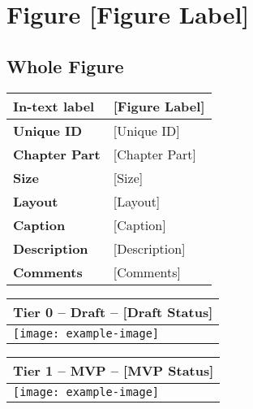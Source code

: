\clearpage

\section{Figure [Figure Label]} \label{sec_[Figure Label]}

\small

\subsection{Whole Figure}

\begin{table}[h!] %
\centering
\small %
\sffamily %
\begin{tabular}{| m{4cm} | m{10cm} |}
    \hline
    \textbf{In-text label} & [Figure Label] \\
    \hline
    \textbf{Unique ID} & [Unique ID] \\
    \hline
    \textbf{Chapter Part} & [Chapter Part] \\
    \hline
    \textbf{Size} & [Size] \\
    \hline
    \textbf{Layout} & [Layout] \\
    \hline
    \textbf{Caption} & [Caption] \\
    \hline
    \textbf{Description} & [Description] \\
    \hline
    \textbf{Comments} & [Comments] \\
    \hline
    \end{tabular}
\end{table}

\begin{table}[h!] %
\centering
\small %
\sffamily %
\begin{tabular}{| m{14.5cm} |}
    \hline
    \textbf{Tier 0 -- Draft -- [Draft Status]}   \\
    \hline
    \hspace{5pt} \texttt{[image: example-image]} \\
    \hline
    \end{tabular}
\end{table}

\begin{table}[h!] %
\centering
\small %
\sffamily %
\begin{tabular}{| m{14.5cm} |}
    \hline
    \textbf{Tier 1 -- MVP -- [MVP Status]} \\
    \hline
    \hspace{5pt} \texttt{[image: example-image]} \\
    \hline
    \end{tabular}
\end{table}